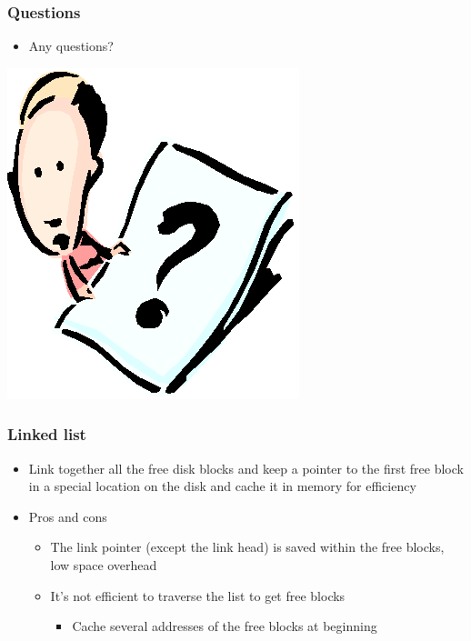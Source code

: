 \documentclass[CJKutf8,xcolor=pdftex,dvipsnames,table]{beamer}
\begin{document}
\begin{CJK*}{UTF8}{song}
  \begin{frame}
    \frametitle{Questions}
    \begin{itemize}
    \item Any questions?
    \end{itemize}
    \begin{center}
      \includegraphics[scale=.5]{question}
    \end{center}
  \end{frame}
  
  \begin{frame}
    \frametitle{Linked list} \pause
    \begin{itemize}\parskip=0pt
    \item Link together all the free disk blocks and keep a pointer to the first free block in a special location on the disk and cache it in memory for efficiency \pause
    \item Pros and cons \pause
      \begin{itemize}\parskip=0pt
      \item The link pointer (except the link head) is saved within the free blocks, low space overhead \pause
      \item It's not efficient to traverse the list to get free blocks \pause
        \begin{itemize}\parskip=0pt
        \item Cache several addresses of the free blocks at beginning
        \end{itemize}
      \end{itemize}
    \end{itemize}
  \end{frame}
  

\end{CJK*}
\end{document}
